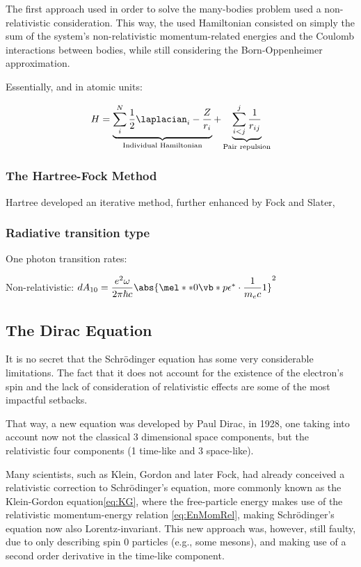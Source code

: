 The first approach used in order to solve the many-bodies problem used a non-relativistic consideration. This way, the used Hamiltonian consisted on simply the sum of the system's non-relativistic momentum-related energies and the Coulomb interactions between bodies, while still considering the Born-Oppenheimer approximation.

Essentially, and in atomic units:

\begin{equation}
    H= \underbrace{\displaystyle\sum_i^N \dfrac{1}{2}\laplacian_i  -\frac{Z}{r_i}}_{\text{Individual Hamiltonian}} + \underbrace{\sum_{i<j}^{j}\dfrac{1}{r_{ij}}}_{\text{Pair repulsion}}
    \label{eq:nonRelHam}
\end{equation}

\subsubsection{The Hartree-Fock Method}

Hartree developed an iterative method, further enhanced by Fock and Slater,

\subsubsection{Radiative transition type}

One photon transition rates:

Non-relativistic: $dA_{10}=\dfrac{e^2 \omega}{2\pi \hbar c}\abs{\mel**{0}{ \vb*{p\epsilon}^*\cdot\dfrac{1}{m_e c}}{1}}^2$

\subsection{The Dirac Equation}

It is no secret that the Schrödinger equation has some very considerable limitations. The fact that it does not account for the existence of the electron's spin and the lack of consideration of relativistic effects are some of the most impactful setbacks.

That way, a new equation was developed by Paul Dirac, in 1928\cite{Dirac}, one taking into account now not the classical 3 dimensional space components, but the relativistic four components (1 time-like and 3 space-like).

Many scientists, such as Klein, Gordon and later Fock, had already conceived a relativistic correction to Schrödinger's equation, more commonly known as the Klein-Gordon equation\eqref{eq:KG}, where the free-particle energy makes use of the relativistic momentum-energy relation \eqref{eq:EnMomRel}, making Schrödinger's equation now also Lorentz-invariant.
 This new approach was, however, still faulty, due to only describing spin 0 particles (e.g., some mesons), and making use of a second order derivative in the time-like component.

